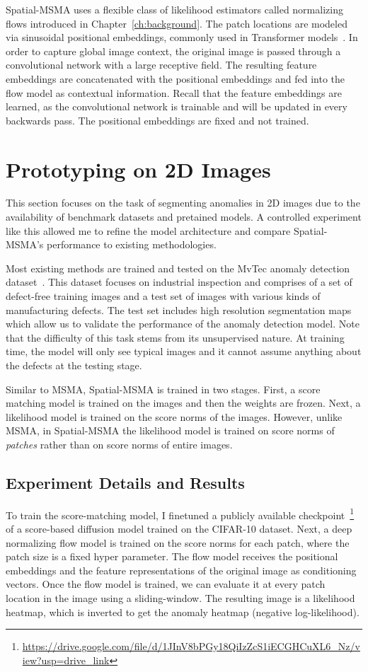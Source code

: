 Spatial-MSMA uses a flexible class of likelihood estimators called normalizing flows introduced in Chapter~\ref{ch:background}. The patch locations are modeled via sinusoidal positional embeddings, commonly used in Transformer models~\cite{vaswani}. In order to capture global image context, the original image is passed through a convolutional network with a large receptive field. The resulting feature embeddings are concatenated with the positional embeddings and fed into the flow model as contextual information. Recall that the feature embeddings are learned, as the convolutional network is trainable and will be updated in every backwards pass. The positional embeddings are fixed and not trained.

\section{Prototyping on 2D Images}

This section focuses on the task of segmenting anomalies in 2D images due to the availability of benchmark datasets and pretained models. A controlled experiment like this allowed me to refine the model architecture and compare Spatial-MSMA's performance to existing methodologies.

Most existing methods are trained and tested on the MvTec anomaly detection dataset~\cite{Bergmann_2019_CVPR}. This dataset focuses on industrial inspection and comprises of a set of defect-free training images and a test set of images with various kinds of manufacturing defects. The test set includes high resolution segmentation maps which allow us to validate the performance of the anomaly detection model. Note that the difficulty of this task stems from its unsupervised nature. At training time, the model will only see typical images and it cannot assume anything about the defects at the testing stage.

Similar to MSMA, Spatial-MSMA is trained in two stages. First, a score matching model is trained on the images and then the weights are frozen. Next, a likelihood model is trained on the score norms of the images. However, unlike MSMA, in Spatial-MSMA the likelihood model is trained on score norms of \textit{patches} rather than on score norms of entire images.

\subsection*{Experiment Details and Results}
To train the score-matching model, I finetuned a publicly available checkpoint~\footnote{\url{https://drive.google.com/file/d/1JInV8bPGy18QiIzZcS1iECGHCuXL6_Nz/view?usp=drive_link}} of a score-based diffusion model trained on the CIFAR-10 dataset. Next, a deep normalizing flow model is trained on the score norms for each patch, where the patch size is a fixed hyper parameter. The flow model receives the positional embeddings and the feature representations of the original image as conditioning vectors. Once the flow model is trained, we can evaluate it at every patch location in the image using a sliding-window. The resulting image is a likelihood heatmap, which is inverted to get the anomaly heatmap (negative log-likelihood).

